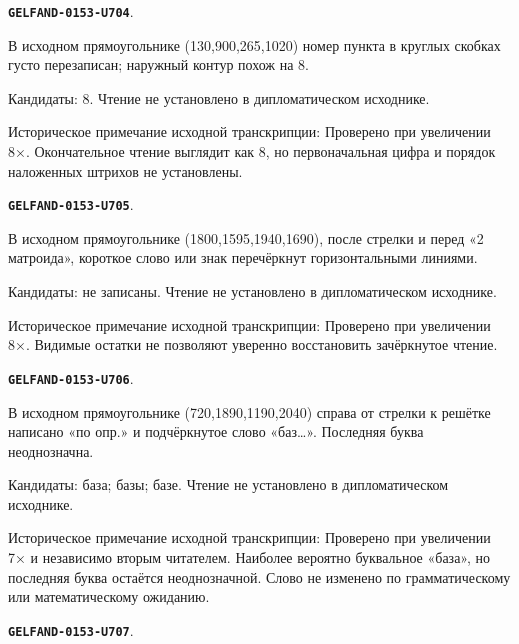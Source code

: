 \documentclass[11pt]{article}
\theoremstyle{definition}
\theoremstyle{remark}
\begin{document}
\par\noindent\leavevmode{}\label{GELFAND-0153-U704}\label{GELFAND-P001412:overwritten-eight:note}\textbf{\texttt{GELFAND-0153-U704}}.\nopagebreak[4]\par
В исходном прямоугольнике (130,900,265,1020) номер пункта в круглых скобках густо перезаписан; наружный контур похож на 8.\par
Кандидаты: 8. Чтение не установлено в дипломатическом исходнике.\par
Историческое примечание исходной транскрипции: Проверено при увеличении 8×. Окончательное чтение выглядит как 8, но первоначальная цифра и порядок наложенных штрихов не установлены.\par\medskip
\par\noindent\leavevmode{}\label{GELFAND-0153-U705}\label{GELFAND-P001412:problem-eleven-cancelled:note}\textbf{\texttt{GELFAND-0153-U705}}.\nopagebreak[4]\par
В исходном прямоугольнике (1800,1595,1940,1690), после стрелки и перед «2 матроида», короткое слово или знак перечёркнут горизонтальными линиями.\par
Кандидаты: не записаны. Чтение не установлено в дипломатическом исходнике.\par
Историческое примечание исходной транскрипции: Проверено при увеличении 8×. Видимые остатки не позволяют уверенно восстановить зачёркнутое чтение.\par\medskip
\par\noindent\leavevmode{}\label{GELFAND-0153-U706}\label{GELFAND-P001412:basis-construction-word:note}\textbf{\texttt{GELFAND-0153-U706}}.\nopagebreak[4]\par
В исходном прямоугольнике (720,1890,1190,2040) справа от стрелки к решётке написано «по опр.» и подчёркнутое слово «баз…». Последняя буква неоднозначна.\par
Кандидаты: база; базы; базе. Чтение не установлено в дипломатическом исходнике.\par
Историческое примечание исходной транскрипции: Проверено при увеличении 7× и независимо вторым читателем. Наиболее вероятно буквальное «база», но последняя буква остаётся неоднозначной. Слово не изменено по грамматическому или математическому ожиданию.\par\medskip
\par\noindent\leavevmode{}\label{GELFAND-0153-U707}\label{GELFAND-P001412:basis-grid:note}\textbf{\texttt{GELFAND-0153-U707}}.\nopagebreak[4]\par
\end{document}
